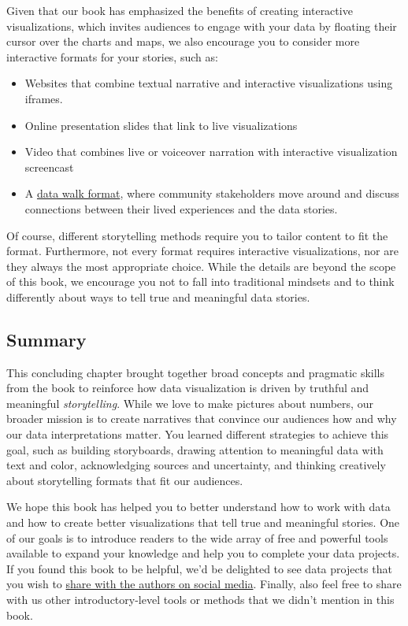 \documentclass[
  english,
]{book}
\providecommand{\tightlist}{%
  \setlength{\itemsep}{0pt}\setlength{\parskip}{0pt}}
\begin{document}
Given that our book has emphasized the benefits of creating interactive visualizations, which invites audiences to engage with your data by floating their cursor over the charts and maps, we also encourage you to consider more interactive formats for your stories, such as:

\begin{itemize}
\tightlist
\item
  Websites that combine textual narrative and interactive visualizations using iframes.
\item
  Online presentation slides that link to live visualizations
\item
  Video that combines live or voiceover narration with interactive visualization screencast
\item
  A \href{https://www.urban.org/sites/default/files/publication/72906/2000510-data-walks-an-innovative-way-to-share-data-with-communities.pdf}{data walk format}, where community stakeholders move around and discuss connections between their lived experiences and the data stories.
\end{itemize}

Of course, different storytelling methods require you to tailor content to fit the format. Furthermore, not every format requires interactive visualizations, nor are they always the most appropriate choice. While the details are beyond the scope of this book, we encourage you not to fall into traditional mindsets and to think differently about ways to tell true and meaningful data stories.

\hypertarget{summary15}{%
\subsection*{Summary}\label{summary15}}

This concluding chapter brought together broad concepts and pragmatic skills from the book to reinforce how data visualization is driven by truthful and meaningful \emph{storytelling}. While we love to make pictures about numbers, our broader mission is to create narratives that convince our audiences how and why our data interpretations matter. You learned different strategies to achieve this goal, such as building storyboards, drawing attention to meaningful data with text and color, acknowledging sources and uncertainty, and thinking creatively about storytelling formats that fit our audiences.

We hope this book has helped you to better understand how to work with data and how to create better visualizations that tell true and meaningful stories. One of our goals is to introduce readers to the wide array of free and powerful tools available to expand your knowledge and help you to complete your data projects. If you found this book to be helpful, we'd be delighted to see data projects that you wish to \href{authors.html}{share with the authors on social media}. Finally, also feel free to share with us other introductory-level tools or methods that we didn't mention in this book.
\end{document}
